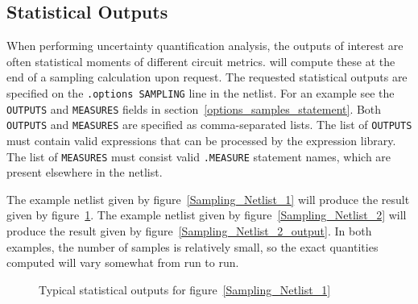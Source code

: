 \subsection{Statistical Outputs}
\label{statistical_outputs}
When performing uncertainty quantification analysis, the outputs of interest are 
often statistical moments of different circuit metrics.   \Xyce{} will compute these at the
end of a sampling calculation upon request.  The requested statistical outputs are 
specified on the \texttt{.options SAMPLING} line in the netlist.  For an example 
see the \texttt{OUTPUTS} and \texttt{MEASURES} fields in section~\ref{options_samples_statement}.  
Both \texttt{OUTPUTS} and \texttt{MEASURES} are specified as comma-separated 
lists.  The list of \texttt{OUTPUTS} must contain valid expressions that can be 
processed by the \Xyce{} expression library.  The list of \texttt{MEASURES} must 
consist valid \texttt{.MEASURE} statement names, which are present elsewhere in 
the netlist.

The example netlist given by figure~\ref{Sampling_Netlist_1} will produce the result 
given by figure~\ref{Sampling_Netlist_1_output}.  The example netlist given 
by figure~\ref{Sampling_Netlist_2} will produce the result given by 
figure~\ref{Sampling_Netlist_2_output}.  In both examples, the number of samples 
is relatively small, so the exact quantities computed will vary somewhat from run to run.
\begin{figure}[htbp]
  \fontsize{9pt}{10pt}
\begin{centering}
\caption{Typical statistical outputs for figure~\ref{Sampling_Netlist_1}}
\label{Sampling_Netlist_1_output}
\end{centering}
\end{figure}

